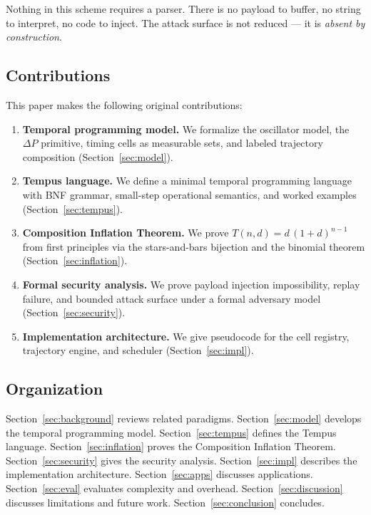 \documentclass[twocolumn,10pt]{article}
\newcommand{\DP}{\Delta P}          %
\begin{document}
Nothing in this scheme requires a parser. There is no payload to
buffer, no string to interpret, no code to inject. The attack surface
is not reduced --- it is \emph{absent by construction}.

\subsection{Contributions}

This paper makes the following original contributions:

\begin{enumerate}[leftmargin=1.5em,topsep=2pt,itemsep=1pt]
  \item \textbf{Temporal programming model.} We formalize the
    oscillator model, the $\DP$ primitive, timing cells as measurable
    sets, and labeled trajectory composition
    (Section~\ref{sec:model}).

  \item \textbf{Tempus language.} We define a minimal temporal
    programming language with BNF grammar, small-step operational
    semantics, and worked examples
    (Section~\ref{sec:tempus}).

  \item \textbf{Composition Inflation Theorem.} We prove
    $T(n,d) = d\,(1+d)^{n-1}$ from first principles via
    the stars-and-bars bijection and the binomial theorem
    (Section~\ref{sec:inflation}).

  \item \textbf{Formal security analysis.} We prove payload injection
    impossibility, replay failure, and bounded attack surface under a
    formal adversary model (Section~\ref{sec:security}).

  \item \textbf{Implementation architecture.} We give pseudocode for
    the cell registry, trajectory engine, and scheduler
    (Section~\ref{sec:impl}).
\end{enumerate}

\subsection{Organization}

Section~\ref{sec:background} reviews related paradigms.
Section~\ref{sec:model} develops the temporal programming model.
Section~\ref{sec:tempus} defines the Tempus language.
Section~\ref{sec:inflation} proves the Composition Inflation Theorem.
Section~\ref{sec:security} gives the security analysis.
Section~\ref{sec:impl} describes the implementation architecture.
Section~\ref{sec:apps} discusses applications.
Section~\ref{sec:eval} evaluates complexity and overhead.
Section~\ref{sec:discussion} discusses limitations and future work.
Section~\ref{sec:conclusion} concludes.
\end{document}
